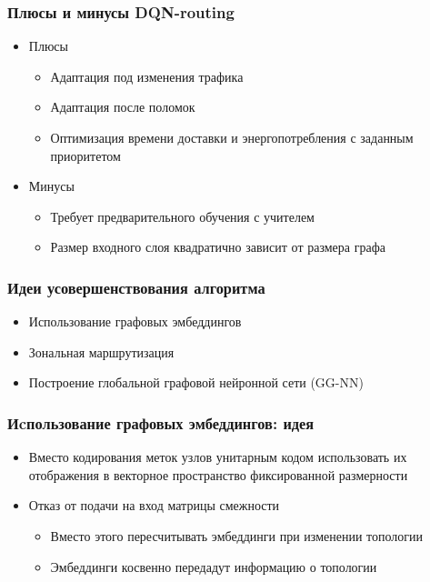 \documentclass{beamer}
\begin{document}
\begin{frame}
  \frametitle{Плюсы и минусы DQN-routing}
  \begin{itemize}
  \item Плюсы
    \begin{itemize}
    \item Адаптация под изменения трафика
    \item Адаптация после поломок
    \item Оптимизация времени доставки и энергопотребления с заданным приоритетом
    \end{itemize}
  \item Минусы
    \begin{itemize}
    \item Требует предварительного обучения с учителем
    \item Размер входного слоя квадратично зависит от размера графа
    \end{itemize}
  \end{itemize}
\end{frame}


\begin{frame}
  \frametitle{Идеи усовершенствования алгоритма}
  \begin{itemize}
  \item Использование графовых эмбеддингов
  \item Зональная маршрутизация
  \item Построение глобальной графовой нейронной сети (GG-NN)
  \end{itemize}
\end{frame}


\begin{frame}
  \frametitle{Иcпользование графовых эмбеддингов: идея}
  \begin{itemize}
  \item Вместо кодирования меток узлов унитарным кодом использовать их
    отображения в векторное пространство фиксированной размерности
  \item Отказ от подачи на вход матрицы смежности
    \begin{itemize}
      \item Вместо этого пересчитывать эмбеддинги при изменении топологии
      \item Эмбеддинги косвенно передадут информацию о топологии
    \end{itemize}
  \end{itemize}
\end{frame}
\end{document}
